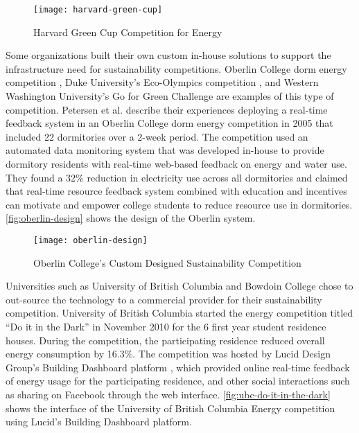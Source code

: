 \begin{figure}[ht!]
	\centering
		\texttt{[image: harvard-green-cup]}
		\caption{Harvard Green Cup Competition for Energy}
		\label{fig:greencup}
\end{figure}

Some organizations built their own custom in-house solutions to support the infrastructure need for sustainability competitions. Oberlin College dorm energy competition \cite{petersen-dorm-energy-reduction}, Duke University's Eco-Olympics competition \cite{duke-eco-olympics}, and Western Washington University's Go for Green Challenge \cite{Mauney-thesis} are examples of this type of competition.  Petersen et al. \cite{petersen-dorm-energy-reduction} describe their experiences deploying a real-time feedback system in an Oberlin College dorm energy competition in 2005 that included 22 dormitories over a 2-week period. The competition used an automated data monitoring system that was developed in-house to provide dormitory residents with real-time web-based feedback on energy and water use. They found a 32\% reduction in electricity use across all dormitories and claimed that real-time resource feedback system combined with education and incentives can motivate and empower college students to reduce resource use in dormitories. \autoref{fig:oberlin-design} shows the design of the Oberlin system. 

\begin{figure}[ht!]
	\centering
		\texttt{[image: oberlin-design]}
		\caption{Oberlin College's Custom Designed Sustainability Competition \cite{petersen-dorm-energy-reduction}}
		\label{fig:oberlin-design}
\end{figure}

Universities such as University of British Columbia \cite{runkle2011dark}  and Bowdoin College\cite{bowdoin} chose to out-source the technology to a commercial provider for their sustainability competition. University of British Columbia started the energy competition titled ``Do it in the Dark'' \cite{runkle2011dark} in November 2010 for the 6 first year student residence houses. During the competition, the participating residence reduced overall energy consumption by 16.3\%. The competition was hosted by Lucid Design Group's Building Dashboard platform \cite{building-dashboard}, which provided online real-time feedback of energy usage for the participating residence, and other social interactions such as sharing on Facebook through the web interface. \autoref{fig:ubc-do-it-in-the-dark} shows the interface of the University of British Columbia Energy competition using Lucid's Building Dashboard platform.

